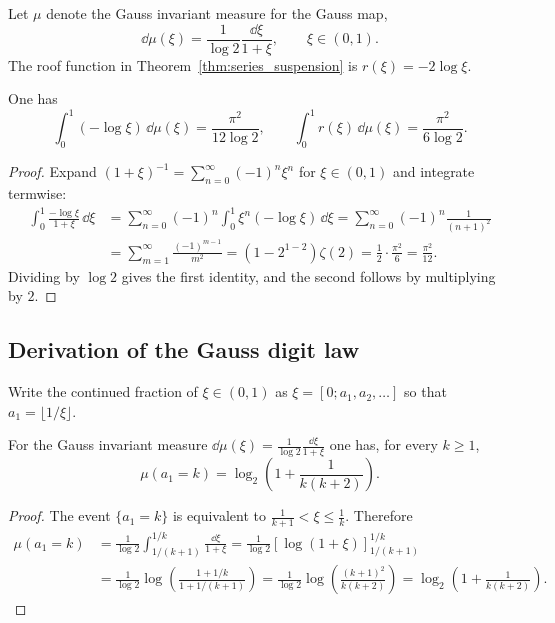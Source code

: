 Let $\mu$ denote the Gauss invariant measure for the Gauss map,
\begin{equation}
\dd\mu(\xi)=\frac{1}{\log 2}\frac{\dd\xi}{1+\xi},\qquad \xi\in(0,1).
\end{equation}
The roof function in Theorem~\ref{thm:series_suspension} is $r(\xi)=-2\log\xi$.

\begin{proposition}
\label{prop:gauss_roof_mean}
One has
\begin{equation}
\int_0^1 (-\log \xi)\,\dd\mu(\xi)=\frac{\pi^2}{12\log 2},
\qquad
\int_0^1 r(\xi)\,\dd\mu(\xi)=\frac{\pi^2}{6\log 2}.
\end{equation}
\end{proposition}
\begin{proof}
Expand $(1+\xi)^{-1}=\sum_{n=0}^\infty (-1)^n\xi^n$ for $\xi\in(0,1)$ and integrate termwise:
\begin{align}
\int_0^1 \frac{-\log \xi}{1+\xi}\,\dd\xi
&=\sum_{n=0}^\infty (-1)^n\int_0^1 \xi^n(-\log\xi)\,\dd\xi
=\sum_{n=0}^\infty (-1)^n\frac{1}{(n+1)^2}
\\
&=\sum_{m=1}^\infty \frac{(-1)^{m-1}}{m^2}
=(1-2^{1-2})\zeta(2)
=\frac{1}{2}\cdot\frac{\pi^2}{6}
=\frac{\pi^2}{12}.
\end{align}
Dividing by $\log 2$ gives the first identity, and the second follows by multiplying by $2$.
\end{proof}

\subsection{Derivation of the Gauss digit law}
\label{app:gauss_digit_law_derivation}

Write the continued fraction of $\xi\in(0,1)$ as $\xi=[0;a_1,a_2,\dots]$ so that $a_1=\lfloor 1/\xi\rfloor$.

\begin{proposition}
\label{prop:gauss_digit_law}
For the Gauss invariant measure $\dd\mu(\xi)=\frac{1}{\log 2}\frac{\dd\xi}{1+\xi}$ one has, for every $k\ge 1$,
\begin{equation}
\mu(a_1=k)=\log_2\!\left(1+\frac{1}{k(k+2)}\right).
\end{equation}
\end{proposition}
\begin{proof}
The event $\{a_1=k\}$ is equivalent to $\frac{1}{k+1}<\xi\le \frac{1}{k}$. Therefore
\begin{align}
\mu(a_1=k)
&=\frac{1}{\log 2}\int_{1/(k+1)}^{1/k}\frac{\dd\xi}{1+\xi}
=\frac{1}{\log 2}\left[\log(1+\xi)\right]_{1/(k+1)}^{1/k}
\\
&=\frac{1}{\log 2}\log\!\left(\frac{1+1/k}{1+1/(k+1)}\right)
=\frac{1}{\log 2}\log\!\left(\frac{(k+1)^2}{k(k+2)}\right)
=\log_2\!\left(1+\frac{1}{k(k+2)}\right).
\end{align}
\end{proof}

